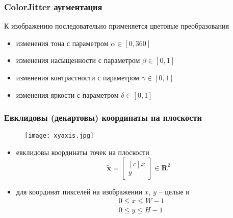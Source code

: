 \documentclass[
    12pt, 
    usepdftitle=false,
    aspectratio=1610
]{beamer}
\begin{document}
\begin{frame}
\frametitle{ColorJitter аугментация}
К изображению последовательно применяется
цветовые преобразования

\begin{itemize}
    \item изменения тона с параметром $\alpha\in[0,360]$
    \item изменения насыщенности с параметром $\beta\in[0,1]$
    \item изменения контрастности с параметром $\gamma\in[0,1]$
    \item изменения яркости с параметром $\delta\in[0,1]$
\end{itemize}

\end{frame}

\begin{frame}
\frametitle{Евклидовы (декартовы) координаты на плоскости}
    \begin{figure}
        \centering
        \texttt{[image: xyaxis.jpg]}
    \end{figure}
    \begin{itemize}
        \item евклидовы координаты точек на плоскости
        $$
            \widetilde{\mathbf{x}}=
            \begin{bmatrix*}[c]
                x \\ y   
            \end{bmatrix*}\in\mathbf{R}^2
        $$
        \item для координат пикселей на изображении $x$, $y$ -- целые и
        \begin{align*}
            &0\leqslant x \leqslant W-1 \\
            &0\leqslant y \leqslant H-1
        \end{align*}
    \end{itemize}
\end{frame}
\end{document}
